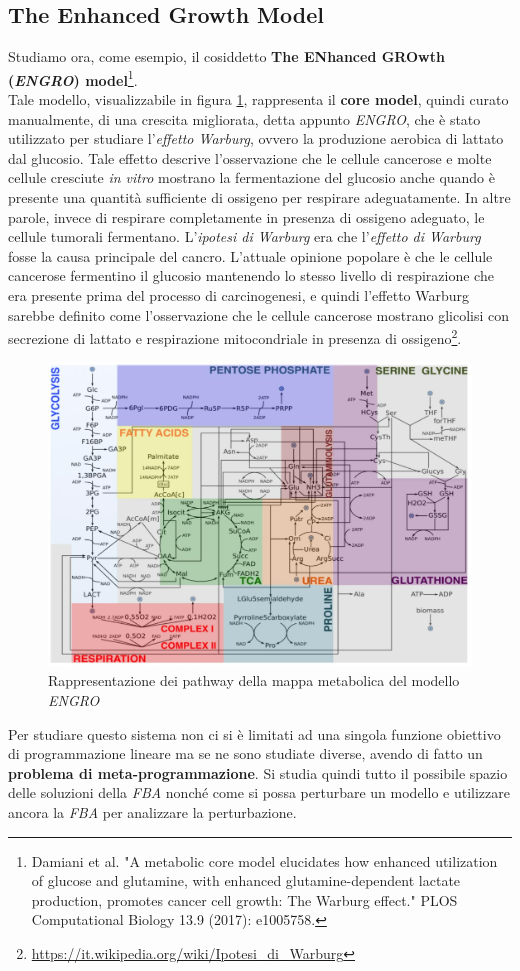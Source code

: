 \documentclass[a4paper,12pt, oneside]{book}
\begin{document}
\subsection{The Enhanced Growth Model}
Studiamo ora, come esempio, il cosiddetto \textbf{The ENhanced GROwth
  (\textit{ENGRO}) model}\footnote{Damiani et al. "A metabolic
  core model elucidates how enhanced utilization of glucose and glutamine, with
  enhanced glutamine-dependent lactate production,
  promotes cancer cell growth: The Warburg
  effect." PLOS Computational Biology 13.9 (2017):
  e1005758.\label{engro1}}.\\
Tale modello, visualizzabile in figura \ref{fig:engro},
rappresenta il \textbf{core model}, quindi curato manualmente, di una crescita
migliorata, detta appunto \textit{ENGRO}, che è stato utilizzato per studiare
l'\textit{effetto Warburg}, ovvero la produzione aerobica di lattato dal
glucosio. Tale effetto descrive l'osservazione che le cellule cancerose e molte
cellule cresciute \textit{in vitro} mostrano la fermentazione del glucosio anche
quando è 
presente una quantità sufficiente di ossigeno per respirare adeguatamente. In
altre parole, invece di respirare completamente in presenza di ossigeno
adeguato, le cellule tumorali fermentano. L'\textit{ipotesi di Warburg} era che
l'\textit{effetto 
di Warburg} fosse la causa principale del cancro. L'attuale opinione popolare è
che le cellule cancerose fermentino il glucosio mantenendo lo stesso livello di
respirazione che era presente prima del processo di carcinogenesi, e quindi
l'effetto Warburg sarebbe definito come l'osservazione che le cellule cancerose
mostrano glicolisi con secrezione di lattato e respirazione mitocondriale in
presenza di
ossigeno\footnote{\url{https://it.wikipedia.org/wiki/Ipotesi_di_Warburg}}. 
\begin{figure}
  \centering
  \includegraphics[scale = 0.25]{img/engro.jpg}
  \caption{Rappresentazione dei pathway della mappa metabolica del modello
    \textit{ENGRO}}
  \label{fig:engro}
\end{figure}
Per studiare questo sistema non ci si è limitati ad una singola funzione
obiettivo di programmazione lineare ma se ne sono studiate diverse, avendo di
fatto un \textbf{problema di meta-programmazione}. Si studia quindi tutto il
possibile spazio delle soluzioni della \textit{FBA} nonché come si possa
perturbare un modello e utilizzare ancora la \textit{FBA} per analizzare la
perturbazione.
\end{document}
